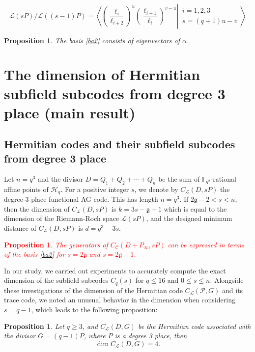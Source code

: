 \documentclass[a4paper]{amsart}
\theoremstyle{plain}
\newtheorem{proposition}[theorem]{Proposition}
\theoremstyle{definition}
\theoremstyle{remark}
\newcommand{\g}{\mathfrak{g}}
\newcommand{\calL}{\mathcal{L}}
\begin{document}
\begin{equation}\label{ba3}
	\mathscr{L}(s P) / \mathcal{L}((s-1) P)=\left\langle\left.\left(\frac{\ell_i}{\ell_{i+2}}\right)^u\left(\frac{\ell_{i+1}}{\ell_i}\right)^{v-u} \right\rvert\, \begin{array}{l}
		i=1,2,3 \\
		s=(q+1) u-v 
	\end{array}\right\rangle
\end{equation}

\begin{proposition}
	The basis \ref{ba2} consists of eigenvectors of $\alpha$.
\end{proposition}
\section{The dimension of Hermitian subfield subcodes from degree 3 place (main result)}
\subsection{Hermitian codes and their subfield subcodes from degree 3 place}
Let $n=q^3$ and the divisor $D=Q_1+Q_2+\cdots+Q_n$ be the sum of $\mathbb{F}_{q^2}$-rational affine points of $\mathscr{H}_q$. For a positive integer $s$, we denote by $C_{\calL}(D,sP)$ the degree-3 place functional AG code. This has length $n=q^3$. If $2 \mathfrak{g}-2<s<n$, then the dimension of $C_{\calL}(D,sP)$ is $k=3s-\mathfrak{g}+1$ which is equal to the dimension of the Riemann-Roch space $\mathscr{L}\left(s P\right)$, and  the designed minimum distance of $C_{\calL}(D,sP)$ is $d=q^3-3s$.

\textcolor{red}{\begin{proposition}
	The generators of $C_{\mathcal{C}}\left(D+P_{\infty}, s P\right)$ can be expressed in terms of the basis \ref{ba2} for $s=2 \g$ and $s=2 \g+1$.
\end{proposition}}

In our study, we carried out experiments to accurately compute the exact dimension of the subfield subcodes $ C_{q}(s) $ for $ q \leq 16 $ and $0 \leq s \leq n$. Alongside these investigations of the dimension of the Hermitian code $ C_{\mathcal{L}}(\mathcal{P}, G) $ and its trace code, we noted an unusual behavior in the dimension when considering $s = q - 1 $, which leads to the following proposition:


\begin{proposition}

	Let $q\geq 3$, and $C_{\mathcal{L}}(D,G)$ be the Hermitian code associated with the divisor $G=(q-1)P$, where $P$ is a degree 3 place, then
	\[\dim C_{\mathcal{L}}(D,G)=4.\]
	
\end{proposition}
\end{document}
